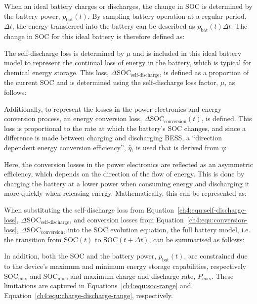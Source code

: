 When an ideal battery charges or discharges, the change in SOC is determined by the battery power, $p_\text{bat}(t)$.
By sampling battery operation at a regular period, $\Delta t$, the energy transferred into the battery can be described as $p_\text{bat}(t)\Delta t$.
The change in SOC for this ideal battery is therefore defined as:



The self-discharge loss is determined by $\mu$ and is included in this ideal battery model to represent the continual loss of energy in the battery, which is typical for chemical energy storage.
This loss, $\Delta\text{SOC}_\text{self-discharge}$, is defined as a proportion of the current SOC and is determined using the self-discharge loss factor, $\mu$, as follows:



Additionally, to represent the losses in the power electronics and energy conversion process, an energy conversion loss, $\Delta\text{SOC}_\text{conversion}(t)$, is defined.
This loss is proportional to the rate at which the battery's SOC changes, and since a difference is made between charging and discharging BESS, a ``direction dependent energy conversion efficiency'', $\hat{\eta}$, is used that is derived from $\eta$:



Here, the conversion losses in the power electronics are reflected as an asymmetric efficiency, which depends on the direction of the flow of energy.
This is done by charging the battery at a lower power when consuming energy and discharging it more quickly when releasing energy.
Mathematically, this can be represented as:



When substituting the self-discharge loss from Equation~\ref{ch4:equ:self-discharge-loss}, $\Delta\text{SOC}_\text{self-discharge}$, and conversion losses from Equation~\ref{ch4:equ:conversion-loss}, $\Delta\text{SOC}_\text{conversion}$, into the SOC evolution equation, the full battery model, i.e. the transition from $\text{SOC}(t)$ to $\text{SOC}(t+\Delta t)$, can be summarised as follows:



In addition, both the SOC and the battery power, $p_\text{bat}(t)$, are constrained due to the device's maximum and minimum energy storage capabilities, respectively $\text{SOC}_\text{max}$ and $\text{SOC}_\text{min}$, and maximum charge and discharge rate, $P_\text{max}$.
These limitations are captured in Equations~\ref{ch4:equ:soc-range} and Equation~\ref{ch4:equ:charge-discharge-range}, respectively.

